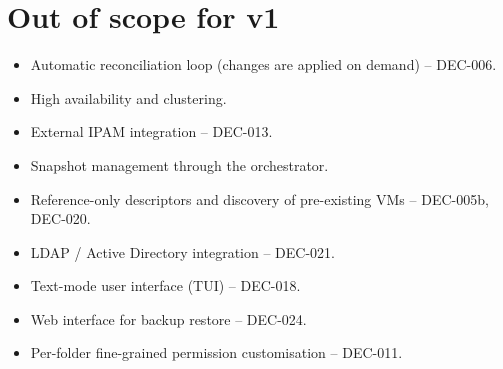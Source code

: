 \section{Out of scope for v1}

\begin{itemize}
  \item Automatic reconciliation loop (changes are applied on
        demand) -- DEC-006.
  \item High availability and clustering.
  \item External IPAM integration -- DEC-013.
  \item Snapshot management through the orchestrator.
  \item Reference-only descriptors and discovery of pre-existing
        VMs -- DEC-005b, DEC-020.
  \item LDAP / Active Directory integration -- DEC-021.
  \item Text-mode user interface (TUI) -- DEC-018.
  \item Web interface for backup restore -- DEC-024.
  \item Per-folder fine-grained permission customisation --
        DEC-011.
\end{itemize}

